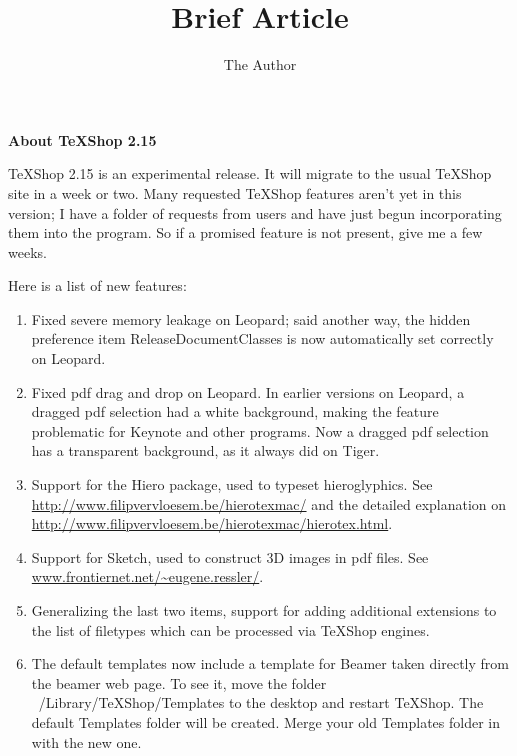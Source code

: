 \documentclass[11pt]{amsart}
\title{Brief Article}
\author{The Author}
\begin{document}
{\bf \Large About TeXShop 2.15}

\vspace{.2in}

TeXShop 2.15 is an experimental release. It will migrate to the usual TeXShop site in a week or two. Many requested TeXShop features aren't yet in this version; I have a folder of requests from users and have just begun incorporating them into the program. So if a promised  feature is not present, give me a few weeks.

Here is a list of new features:

\begin{enumerate}
\item Fixed severe memory leakage on Leopard; said another way, the hidden preference item ReleaseDocumentClasses is now automatically set correctly on Leopard.
\item Fixed pdf drag and drop on Leopard. In earlier versions on Leopard, a dragged pdf selection had a white background, making the feature problematic for Keynote and other programs. Now a dragged pdf selection has a transparent background, as it always did on Tiger.
\item  Support for the Hiero package, used to typeset hieroglyphics. See \url{http://www.filipvervloesem.be/hierotexmac/} and
the detailed explanation on \url{http://www.filipvervloesem.be/hierotexmac/hierotex.html}.
\item Support for Sketch, used to construct 3D images in pdf files. See  \url{www.frontiernet.net/~eugene.ressler/}.
\item Generalizing the last two items, support for adding additional extensions to the list of filetypes which can be processed via TeXShop engines.
\item The default templates now include a template for Beamer taken directly from the beamer web page. To see it, move the folder ~/Library/TeXShop/Templates to the desktop and restart TeXShop. The default Templates folder will be created. Merge your old Templates folder in with the new one.
\end{enumerate}
\end{document}
